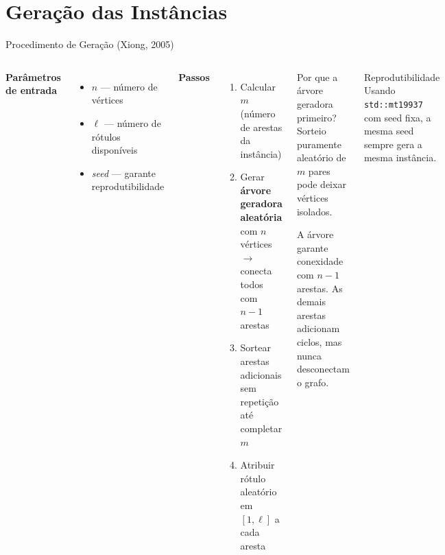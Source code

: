 \documentclass{beamer}
\begin{document}
\section{Geração das Instâncias}


\begin{frame}{Procedimento de Geração (Xiong, 2005)}

\begin{columns}[T]


    \textbf{Parâmetros de entrada}
    \begin{itemize}
        \item $n$ — número de vértices
        \item $\ell$ — número de rótulos disponíveis
        \item \textit{seed} — garante reprodutibilidade
    \end{itemize}

    \vspace{0.3cm}

    \textbf{Passos}
    \begin{enumerate}
        \item Calcular $m$ (número de arestas da instância)
        \item Gerar \textbf{árvore geradora aleatória} com $n$ vértices \\ $\rightarrow$ conecta todos com $n-1$ arestas
        \item Sortear arestas adicionais sem repetição até completar $m$
        \item Atribuir rótulo aleatório em $[1, \ell]$ a cada aresta
    \end{enumerate}


    \begin{alertblock}{Por que a árvore geradora primeiro?}
        Sorteio puramente aleatório de $m$ pares pode deixar vértices isolados.

        \vspace{0.2cm}

        A árvore garante conexidade com $n-1$ arestas. As demais arestas adicionam ciclos, mas nunca desconectam o grafo.
    \end{alertblock}

    \vspace{0.3cm}

    \begin{exampleblock}{Reprodutibilidade}
        Usando \texttt{std::mt19937} com seed fixa, a mesma seed sempre gera a mesma instância.
    \end{exampleblock}

\end{columns}

\end{frame}
\end{document}
